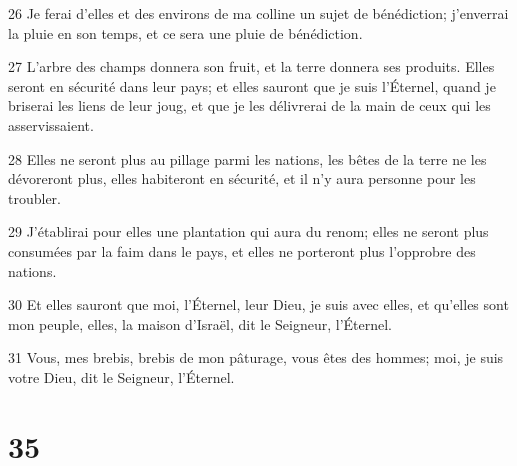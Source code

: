 \par 26 Je ferai d'elles et des environs de ma colline un sujet de bénédiction; j'enverrai la pluie en son temps, et ce sera une pluie de bénédiction.
\par 27 L'arbre des champs donnera son fruit, et la terre donnera ses produits. Elles seront en sécurité dans leur pays; et elles sauront que je suis l'Éternel, quand je briserai les liens de leur joug, et que je les délivrerai de la main de ceux qui les asservissaient.
\par 28 Elles ne seront plus au pillage parmi les nations, les bêtes de la terre ne les dévoreront plus, elles habiteront en sécurité, et il n'y aura personne pour les troubler.
\par 29 J'établirai pour elles une plantation qui aura du renom; elles ne seront plus consumées par la faim dans le pays, et elles ne porteront plus l'opprobre des nations.
\par 30 Et elles sauront que moi, l'Éternel, leur Dieu, je suis avec elles, et qu'elles sont mon peuple, elles, la maison d'Israël, dit le Seigneur, l'Éternel.
\par 31 Vous, mes brebis, brebis de mon pâturage, vous êtes des hommes; moi, je suis votre Dieu, dit le Seigneur, l'Éternel.

\chapter{35}

